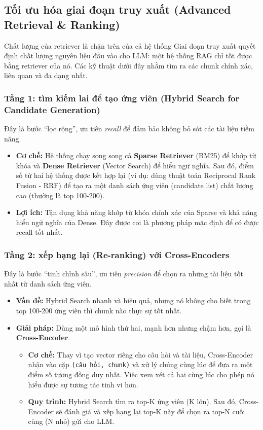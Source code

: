 \subsection{Tối ưu hóa giai đoạn truy xuất (Advanced Retrieval \& Ranking)}
\label{ssec:advanced_retrieval_ranking}
\begin{keyidea}{Chất lượng của retriever là chặn trên của cả hệ thống}
	Giai đoạn truy xuất quyết định chất lượng nguyên liệu đầu vào cho LLM: một hệ thống RAG chỉ tốt được bằng retriever của nó. Các kỹ thuật dưới đây nhằm tìm ra các chunk chính xác, liên quan và đa dạng nhất.
\end{keyidea}

\subsubsection{Tầng 1: tìm kiếm lai để tạo ứng viên (Hybrid Search for Candidate Generation)}
Đây là bước “lọc rộng”, ưu tiên \textit{recall} để đảm bảo không bỏ sót các tài liệu tiềm năng.
\begin{itemize}
	\item \textbf{Cơ chế:} Hệ thống chạy song song cả \textbf{Sparse Retriever} (BM25) để khớp từ khóa và \textbf{Dense Retriever} (Vector Search) để hiểu ngữ nghĩa. Sau đó, điểm số từ hai hệ thống được kết hợp lại (ví dụ: dùng thuật toán Reciprocal Rank Fusion - RRF) để tạo ra một danh sách ứng viên (candidate list) chất lượng cao (thường là top 100-200).
	\item \textbf{Lợi ích:} Tận dụng khả năng khớp từ khóa chính xác của Sparse và khả năng hiểu ngữ nghĩa của Dense. Đây được coi là phương pháp mặc định để có được recall tốt nhất.
\end{itemize}

\subsubsection{Tầng 2: xếp hạng lại (Re-ranking) với Cross-Encoders}
Đây là bước “tinh chỉnh sâu”, ưu tiên \textit{precision} để chọn ra những tài liệu tốt nhất từ danh sách ứng viên.
\begin{itemize}
	\item \textbf{Vấn đề:} Hybrid Search nhanh và hiệu quả, nhưng nó không cho biết trong top 100-200 ứng viên thì chunk nào thực sự tốt nhất.
	\item \textbf{Giải pháp:} Dùng một mô hình thứ hai, mạnh hơn nhưng chậm hơn, gọi là \textbf{Cross-Encoder}.
	\begin{itemize}
		\item \textbf{Cơ chế:} Thay vì tạo vector riêng cho câu hỏi và tài liệu, Cross-Encoder nhận vào cặp \texttt{(câu hỏi, chunk)} và xử lý chúng cùng lúc để đưa ra một điểm số tương đồng duy nhất. Việc xem xét cả hai cùng lúc cho phép nó hiểu được sự tương tác tinh vi hơn.
		\item \textbf{Quy trình:} Hybrid Search tìm ra top-K ứng viên (K lớn). Sau đó, Cross-Encoder sẽ đánh giá và xếp hạng lại top-K này để chọn ra top-N cuối cùng (N nhỏ) gửi cho LLM.
	\end{itemize}
\end{itemize}

